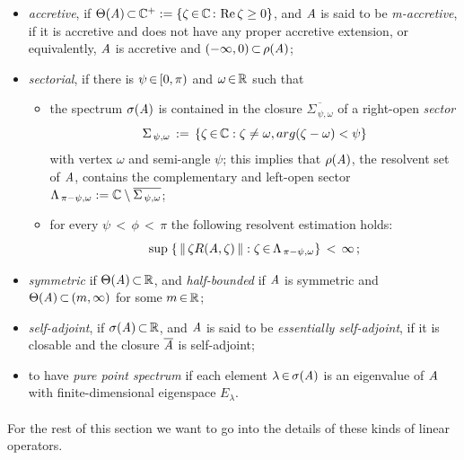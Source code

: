 \documentclass[11pt,twoside]{article}
\begin{document}
\begin{itemize}[leftmargin=4mm,itemsep=2pt]
\item[1.]
\textit{accretive},
if $\Theta(\mathit{A}) {\,\subset\,} {\mathbb{C}}^+ := \{\zeta {\,\in\,} {\mathbb{C}}{\,:\,} \operatorname{Re} \zeta \geq 0\}$,
and $\mathit{A}$ is said to be \textit{m-accretive},
if it is accretive and does not have any proper accretive extension,
or equivalently,
$\mathit{A}$ is accretive and $(-\infty,0) {\,\subset\,} \rho(\mathit{A})$;

\item[2.]
\textit{sectorial},
if there is $\psi {\,\in\,} [0,\pi)$ and $\omega {\,\in\,} {\mathbb{R}}$ such that

\begin{itemize}[leftmargin=9mm]
\item[(S-1)]
the spectrum $\sigma(\mathit{A})$ is contained in the closure
$\overline{\Sigma_{\,\psi,\omega} }$ of a right-open \textit{sector}
\[
\Sigma_{\,\psi,\omega} \,:=\,
\{\zeta {\,\in\,} {\mathbb{C}}: \zeta \neq \omega, arg(\zeta-\omega) < \psi\}
\]
with vertex $\omega$ and semi-angle $\psi$;
this implies that 
$\rho(\mathit{A})$,
the resolvent set of $\mathit{A}$,
contains the complementary and left-open sector
$\Lambda_{\,\pi-\psi,\omega} :=
{\mathbb{C}} \setminus \overline{ \Sigma_{\,\psi,\omega} }$;

\item[(S-2)]
for every $\psi {\,<\,} \phi {\,<\,} \pi$
the following resolvent estimation holds:
\begin{equation}\label{RESOLVENT_ESTIMATE_II}
\sup \;
\{\, \left\lVert \,\zeta R(\mathit{A},\zeta)\, \right\rVert:
  \zeta {\,\in\,} \Lambda_{\,\pi-\psi,\omega}
\}
\, < \, \infty\,;
\end{equation}
\end{itemize}

\item[3.]
\textit{symmetric} if $\Theta(\mathit{A}) {\,\subset\,} {\mathbb{R}}$,
and \textit{half-bounded} if $\mathit{A}$ is symmetric
and $\Theta(\mathit{A}) {\,\subset\,} (m,\infty)$ for some $m {\,\in\,} {\mathbb{R}}$;
\item[4.]
\textit{self-adjoint},
if $\sigma(\mathit{A}) {\,\subset\,} {\mathbb{R}}$,
and $\mathit{A}$ is said to be \textit{essentially self-adjoint},
if it is closable and the closure $\overline{\mathit{A}}$ is self-adjoint;
\item[5.]
to have \textit{pure point spectrum}
if each element $\lambda {\,\in\,} \sigma(\mathit{A})$ is an eigen\-value
of $\mathit{A}$ with finite-dimensional eigenspace $E_{\lambda}$.
\end{itemize}

\paragraph{}
For the rest of this section
we want to go into the details of these kinds of linear operators.
\end{document}
